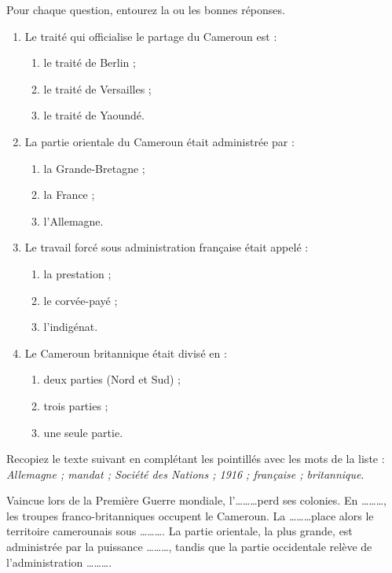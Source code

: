 \documentclass[11pt]{article}
\begin{document}
\begin{exercice}[QCM]
Pour chaque question, entourez la ou les bonnes réponses.
\begin{enumerate}
\item Le traité qui officialise le partage du Cameroun est :
\begin{enumerate}
\item le traité de Berlin ;
\item le traité de Versailles ;
\item le traité de Yaoundé.
\end{enumerate}
\item La partie orientale du Cameroun était administrée par :
\begin{enumerate}
\item la Grande-Bretagne ;
\item la France ;
\item l'Allemagne.
\end{enumerate}
\item Le travail forcé sous administration française était appelé :
\begin{enumerate}
\item la prestation ;
\item le corvée-payé ;
\item l'indigénat.
\end{enumerate}
\item Le Cameroun britannique était divisé en :
\begin{enumerate}
\item deux parties (Nord et Sud) ;
\item trois parties ;
\item une seule partie.
\end{enumerate}
\end{enumerate}
\end{exercice}

\begin{exercice}
Recopiez le texte suivant en complétant les pointillés avec les mots de la liste : \emph{Allemagne ; mandat ; Société des Nations ; 1916 ; française ; britannique}.

\medskip
Vaincue lors de la Première Guerre mondiale, l'\ldots\ldots\ldots perd ses colonies. En \ldots\ldots\ldots, les troupes franco-britanniques occupent le Cameroun. La \ldots\ldots\ldots place alors le territoire camerounais sous \ldots\ldots\ldots. La partie orientale, la plus grande, est administrée par la puissance \ldots\ldots\ldots, tandis que la partie occidentale relève de l'administration \ldots\ldots\ldots.
\end{exercice}
\end{document}
